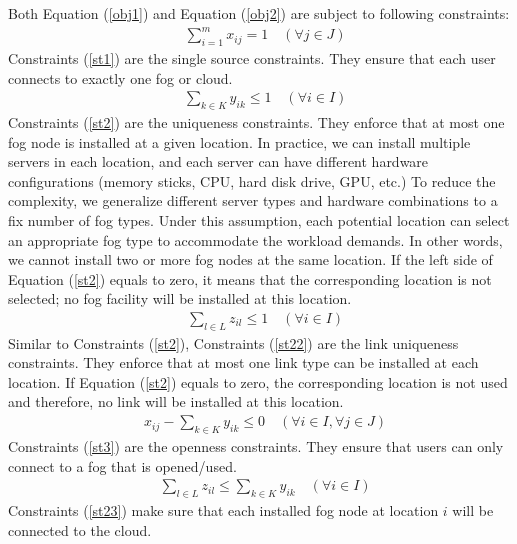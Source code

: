 \documentclass[10pt,journal,compsoc]{IEEEtran}
\newcommand{\Eq}[1]{(\ref{#1})}
\begin{document}
Both Equation \Eq{obj1} and Equation \Eq{obj2} are subject to following constraints:
\begin{align}
&\sum_{i=1}^m x_{ij} =1\quad  (\forall j \in J )\label{st1}
\end{align}
Constraints \Eq{st1} are the single source constraints. They ensure that each user connects to exactly one fog or cloud. \\
\begin{align}
&\sum_{k\in K} y_{ik} \leq1 \quad(\forall i \in I )\label{st2}
\end{align}
Constraints \Eq{st2} are the uniqueness constraints. They enforce that at most one fog node is installed at a given location.  In practice, we can install multiple servers in each location, and each server can have different hardware configurations (memory sticks, CPU, hard disk drive, GPU, etc.) To reduce the complexity, we generalize different server types and hardware combinations to a fix number of fog types. Under this assumption, each potential location can select an appropriate fog type to accommodate the workload demands. In other words, we cannot install two or more fog nodes at the same location. If the left side of Equation \Eq{st2} equals to zero, it means that the corresponding location is not selected; no fog facility will be installed at this location.\\
\begin{align}
&\sum_{l\in L} z_{il} \leq1\quad(\forall i \in I) \label{st22} %
\end{align}
Similar to Constraints \Eq{st2}, Constraints \Eq{st22} are the link uniqueness constraints. They enforce that at most one link type can be installed at each location. If Equation \Eq{st2} equals to zero, the corresponding location is not used and therefore, no link will be installed at this location.\\
\begin{align}
& x_{ij} - \sum_{k\in K} y_{ik}\leq0  \quad(\forall i \in I,\forall j \in J)\label{st3}
\end{align}
Constraints \Eq{st3} are the openness constraints. They ensure that users can only connect to a fog that is opened/used.\\ 
\begin{align}
&\sum_{l\in L} z_{il} \leq \sum_{k\in K} y_{ik} \quad (\forall i \in I) \label{st23}
\end{align}
Constraints \Eq{st23} make sure that each installed fog node at location $i$ will be connected to the cloud.\\
\end{document}
